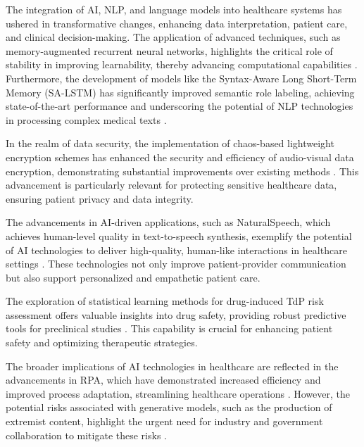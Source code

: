 The integration of AI, NLP, and language models into healthcare systems has ushered in transformative changes, enhancing data interpretation, patient care, and clinical decision-making. The application of advanced techniques, such as memory-augmented recurrent neural networks, highlights the critical role of stability in improving learnability, thereby advancing computational capabilities \cite{das2024exploringlearnabilitymemoryaugmentedrecurrent}. Furthermore, the development of models like the Syntax-Aware Long Short-Term Memory (SA-LSTM) has significantly improved semantic role labeling, achieving state-of-the-art performance and underscoring the potential of NLP technologies in processing complex medical texts \cite{qian2017syntaxawarelstmmodel}.



In the realm of data security, the implementation of chaos-based lightweight encryption schemes has enhanced the security and efficiency of audio-visual data encryption, demonstrating substantial improvements over existing methods \cite{shah2022novelchaosbasedlightweightimage}. This advancement is particularly relevant for protecting sensitive healthcare data, ensuring patient privacy and data integrity.



The advancements in AI-driven applications, such as NaturalSpeech, which achieves human-level quality in text-to-speech synthesis, exemplify the potential of AI technologies to deliver high-quality, human-like interactions in healthcare settings \cite{tan2022naturalspeechendtoendtextspeech}. These technologies not only improve patient-provider communication but also support personalized and empathetic patient care.



The exploration of statistical learning methods for drug-induced TdP risk assessment offers valuable insights into drug safety, providing robust predictive tools for preclinical studies \cite{xi2022statisticallearningpreclinicaldrug}. This capability is crucial for enhancing patient safety and optimizing therapeutic strategies.



The broader implications of AI technologies in healthcare are reflected in the advancements in RPA, which have demonstrated increased efficiency and improved process adaptation, streamlining healthcare operations \cite{pandy2024advancementsroboticsprocessautomation}. However, the potential risks associated with generative models, such as the production of extremist content, highlight the urgent need for industry and government collaboration to mitigate these risks \cite{mcguffie2020radicalizationrisksgpt3advanced}.




